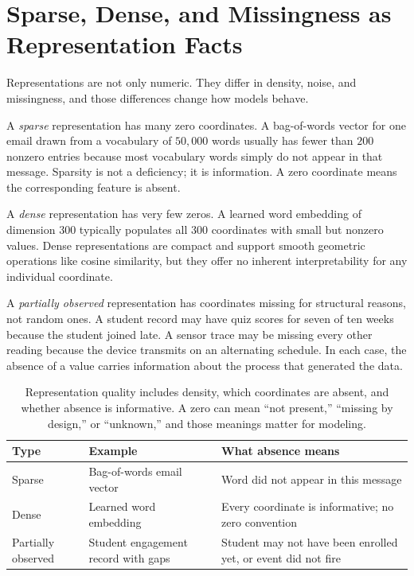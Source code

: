\section*{Sparse, Dense, and Missingness as Representation Facts}

Representations are not only numeric. They differ in density, noise, and missingness, and those differences change how models behave.

A \emph{sparse} representation has many zero coordinates. A bag-of-words vector for one email drawn from a vocabulary of $50{,}000$ words usually has fewer than $200$ nonzero entries because most vocabulary words simply do not appear in that message. Sparsity is not a deficiency; it is information. A zero coordinate means the corresponding feature is absent.

A \emph{dense} representation has very few zeros. A learned word embedding of dimension $300$ typically populates all $300$ coordinates with small but nonzero values. Dense representations are compact and support smooth geometric operations like cosine similarity, but they offer no inherent interpretability for any individual coordinate.

A \emph{partially observed} representation has coordinates missing for structural reasons, not random ones. A student record may have quiz scores for seven of ten weeks because the student joined late. A sensor trace may be missing every other reading because the device transmits on an alternating schedule. In each case, the absence of a value carries information about the process that generated the data.

\begin{table}[t]
\centering
\small
\setlength{\tabcolsep}{4pt}
\begin{tabular}{p{1.89cm}p{3.26cm}p{4.8cm}}
\toprule
Type & Example & What absence means \\
\midrule
Sparse & Bag-of-words email vector & Word did not appear in this message \\
Dense & Learned word embedding & Every coordinate is informative; no zero convention \\
Partially observed & Student engagement record with gaps & Student may not have been enrolled yet, or event did not fire \\
\bottomrule
\end{tabular}
\caption{Representation quality includes density, which coordinates are absent, and whether absence is informative. A zero can mean ``not present,'' ``missing by design,'' or ``unknown,'' and those meanings matter for modeling.}
\label{tab:sparse-dense-missing}
\end{table}

